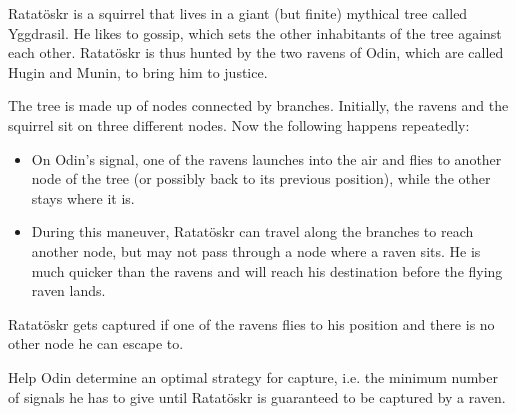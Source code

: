 

Ratatöskr is a squirrel that lives in a giant (but finite) mythical tree called Yggdrasil. He likes to gossip, which sets the other inhabitants of the tree against each other. Ratatöskr is thus hunted by the two ravens of Odin, which are called Hugin and Munin, to bring him to justice.

The tree is made up of nodes connected by branches. Initially, the ravens and the squirrel sit on three different nodes. %
Now the following happens repeatedly:
\begin{itemize}
\item On Odin's signal, one of the ravens launches into the air and flies to another node of the tree (or possibly back to its previous position), while the other stays where it is. %
\item During this maneuver, Ratatöskr can travel along the branches to reach another node, but may not pass through a node where a raven sits. He is much quicker than the ravens and will reach his destination before the flying raven lands.
\end{itemize}
Ratatöskr gets captured if one of the ravens flies to his position and there is no other node he can escape to.

Help Odin determine an optimal strategy for capture, i.e. the minimum number of signals he has to give until Ratatöskr is guaranteed to be captured by a raven.

